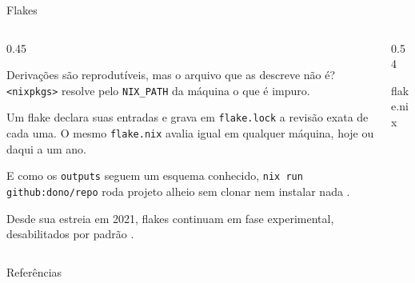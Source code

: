 \documentclass{beamer}
\newcommand{\termo}[1]{\alert{#1}}
\newcommand{\code}[1]{\texttt{#1}}
\newlength{\nixcodelift}\setlength{\nixcodelift}{7pt}
\newcommand{\nixcode}[2]{\vspace*{-\nixcodelift}\begin{nixbox}{#2}\end{nixbox}}
\begin{document}
\begin{frame}{Flakes}
	\begin{columns}[T,onlytextwidth]
		\begin{column}{0.45\textwidth}
			\small\raggedright
			Derivações são reprodutíveis, mas o arquivo que as descreve não é? \code{<nixpkgs>} resolve pelo \code{NIX\_PATH} da máquina o que é impuro.

			Um \termo{flake} declara suas entradas e grava em \code{flake.lock} a revisão exata de cada uma. O mesmo \code{flake.nix} avalia igual em qualquer máquina, hoje ou daqui a um ano.

			E como os \code{outputs} seguem um esquema conhecido, \code{nix run github:dono/repo} roda projeto alheio sem clonar nem instalar nada \cite{nixmanual}.

			Desde sua estreia em 2021, flakes continuam em fase experimental, desabilitados por padrão \cite{nixmanual}.
		\end{column}
		\begin{column}{0.54\textwidth}
			\nixcode{code/flakeex}{flake.nix}
		\end{column}
	\end{columns}
\end{frame}

\begin{frame}[allowframebreaks,t]{Referências}
	\printbibliography[heading=none]
\end{frame}
\end{document}
